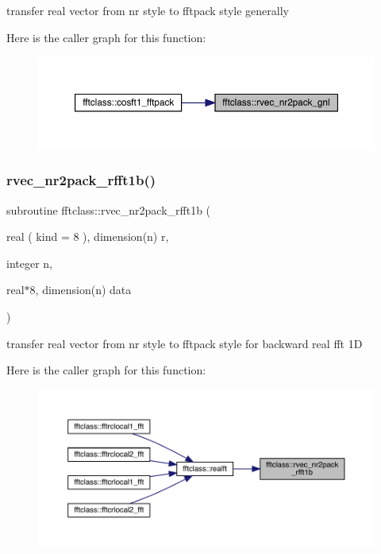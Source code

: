 transfer real vector from nr style to fftpack style generally 

Here is the caller graph for this function\+:\nopagebreak
\begin{figure}[H]
\begin{center}
\leavevmode
\includegraphics[width=350pt]{namespacefftclass_a2c47e8aa546c8ea9f5f23219be52d57e_icgraph}
\end{center}
\end{figure}
\mbox{\label{namespacefftclass_a78a858cc72da790e88dc826f5bdd14b3}} 
\subsubsection{\texorpdfstring{rvec\_nr2pack\_rfft1b()}{rvec\_nr2pack\_rfft1b()}}
{\footnotesize\ttfamily subroutine fftclass\+::rvec\+\_\+nr2pack\+\_\+rfft1b (\begin{DoxyParamCaption}\item[{real ( kind = 8 ), dimension(n)}]{r,  }\item[{integer}]{n,  }\item[{real$\ast$8, dimension(n)}]{data }\end{DoxyParamCaption})}



transfer real vector from nr style to fftpack style for backward real fft 1D 

Here is the caller graph for this function\+:\nopagebreak
\begin{figure}[H]
\begin{center}
\leavevmode
\includegraphics[width=350pt]{namespacefftclass_a78a858cc72da790e88dc826f5bdd14b3_icgraph}
\end{center}
\end{figure}
\mbox{\label{namespacefftclass_ac09ed442a8bb7846768adbe2d5c798c6}} 
